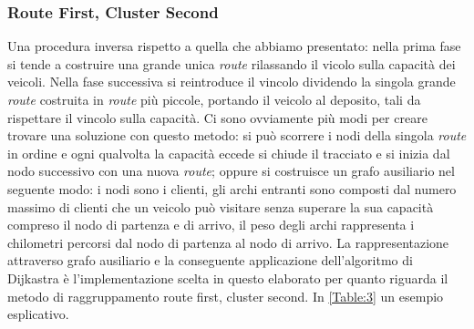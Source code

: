 \documentclass[]{article}
\begin{document}
\subsubsection{Route First, Cluster Second}
Una procedura inversa rispetto a quella che abbiamo presentato: nella prima fase si tende a costruire una grande unica \emph{route} rilassando il vicolo sulla capacità dei veicoli. Nella fase successiva si reintroduce il vincolo dividendo la singola grande \emph{route} costruita in \emph{route}  più piccole, portando il veicolo al deposito, tali da rispettare il vincolo sulla capacità. Ci sono ovviamente più modi per creare trovare una soluzione con questo metodo: si può scorrere i nodi della singola \emph{route} in ordine e ogni qualvolta la capacità eccede si chiude il tracciato e si inizia dal nodo successivo con una nuova  \emph{route}; oppure si costruisce un grafo ausiliario nel seguente modo: i nodi sono i clienti, gli archi entranti sono composti dal numero massimo di clienti che un veicolo può visitare senza superare la sua capacità compreso il nodo di partenza e di arrivo, il peso degli archi rappresenta i chilometri percorsi dal nodo di partenza al nodo di arrivo.
La rappresentazione attraverso grafo ausiliario e la conseguente applicazione dell'algoritmo di Dijkastra è l'implementazione  scelta in questo elaborato per quanto riguarda il metodo di raggruppamento route first, cluster second. In \ref{Table:3} un esempio esplicativo.
\end{document}
